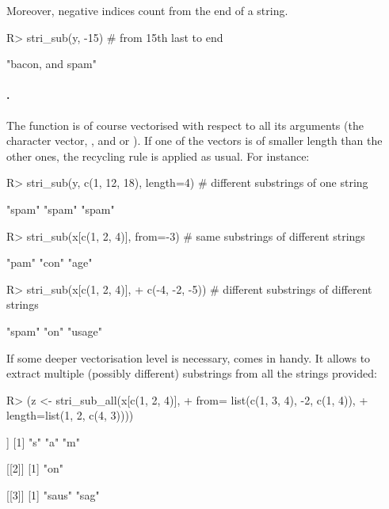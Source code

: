 \documentclass[nojss]{jss}
\begin{document}
Moreover, negative indices count from the end of a string.

\begin{Schunk}
\begin{Sinput}
R> stri_sub(y, -15)           # from 15th last to end
\end{Sinput}
\begin{Soutput}
[1] "bacon, and spam"
\end{Soutput}
\end{Schunk}


\paragraph{.}
The   function is of course vectorised with respect
to all its arguments
(the character vector, , and  or ).
If one of the vectors is of smaller length than the other ones,
the recycling rule is applied as usual. For instance:

\begin{Schunk}
\begin{Sinput}
R> stri_sub(y, c(1, 12, 18), length=4) # different substrings of one string
\end{Sinput}
\begin{Soutput}
[1] "spam" "spam" "spam"
\end{Soutput}
\begin{Sinput}
R> stri_sub(x[c(1, 2, 4)], from=-3)    # same substrings of different strings
\end{Sinput}
\begin{Soutput}
[1] "pam" "con" "age"
\end{Soutput}
\begin{Sinput}
R> stri_sub(x[c(1, 2, 4)],
+    c(-4, -2, -5))  # different substrings of different strings
\end{Sinput}
\begin{Soutput}
[1] "spam"  "on"    "usage"
\end{Soutput}
\end{Schunk}

If some deeper vectorisation level is necessary, 
comes in handy. It allows to extract multiple (possibly different) substrings
from all the strings provided:


\begin{Schunk}
\begin{Sinput}
R> (z <- stri_sub_all(x[c(1, 2, 4)],
+    from=  list(c(1, 3, 4), -2, c(1, 4)),
+    length=list(1,           2, c(4, 3))))
\end{Sinput}
\begin{Soutput}
[[1]]
[1] "s" "a" "m"

[[2]]
[1] "on"

[[3]]
[1] "saus" "sag"
\end{Soutput}
\end{Schunk}
\end{document}
